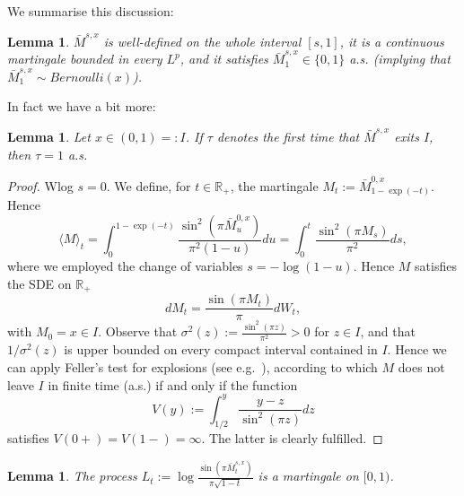 \documentclass[reqno, a4paper]{amsart}
\newtheorem{lemma}[theorem]{Lemma}
\theoremstyle{remark}
\newcommand{\1}{\mathbbm 1}
\numberwithin{equation}{section}
\numberwithin{theorem}{section}
\newcommand{\mo}{\bar{M}}
\newcommand{\MB}[1]{{\color{purple}{[MB: #1]}}}
\begin{document}
We summarise this discussion:

\begin{lemma}
	$\mo^{s,x}$ is well-defined on the whole interval $[s,1]$, it is a continuous martingale bounded in every $L^p$, and it satisfies $\mo^{s,x}_1\in\{0,1\}$ a.s. (implying that $\mo^{s,x}_1\sim Bernoulli(x)$).
\end{lemma}

In fact we have a bit more:

\begin{lemma}\label{lem:FellerTest}
	Let $x\in(0,1)=:I$. If $\tau$ denotes the first time that $\mo^{s,x}$ exits $I$, then $\tau=1$ a.s.
\end{lemma}

\begin{proof}
Wlog $s=0$.	We define, for $t\in\mathbb R_+$, the martingale $M_t :=\mo^{0,x}_{1-\exp(-t)}$.
Hence
\[\langle M\rangle_t = \int_0^{1-\exp(-t)}\frac{\sin^2(\pi\mo^{0,x}_u)}{\pi^2(1-u)}du = \int_0^t\frac{\sin^2(\pi M_s)}{\pi^2}ds,
\]
where we employed the change of variables $s=-\log(1-u)$. Hence $M$ satisfies the SDE on $\mathbb R_+$
\[dM_t = \frac{\sin(\pi M_t)}{\pi}dW_t, \]
with $M_0=x\in I$.
Observe that $\sigma^2(z):=\frac{\sin^2(\pi z)}{\pi^2}>0$ for $z\in I$, and that $1/\sigma^2(z)$ is upper bounded on every compact interval contained in $I$. Hence we can apply Feller's test for explosions (see e.g.\  \cite[Theorem 5.29]{KaSh12}), according to which $M$ does not leave $I$ in finite time (a.s.) if and only if the function
\[V(y):=\int_{1/2}^y\frac{y-z}{\sin^2(\pi z)}dz
\]
satisfies $V(0+)=V(1-)=\infty$.  The latter is clearly fulfilled.
\end{proof}







\begin{lemma}\label{lem_log_is_mart}
	The process $L_t:=\log\frac{\sin(\pi\mo^{s,x}_t)}{\pi\sqrt{1-t}}$ is a martingale on $[0,1)$.
\end{lemma}
\end{document}
